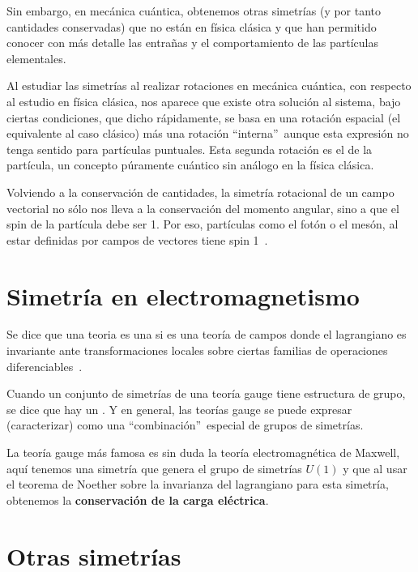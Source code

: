 Sin embargo, en mecánica cuántica, obtenemos otras simetrías (y por tanto cantidades conservadas) que no están en física clásica y que han permitido conocer con más detalle las entrañas y el comportamiento de las partículas elementales.

Al estudiar las simetrías al realizar rotaciones en mecánica cuántica, con respecto al estudio en física clásica, nos aparece que existe otra solución al sistema, bajo ciertas condiciones, que dicho rápidamente, se basa en una rotación espacial (el equivalente al caso clásico) más una rotación \textquotedblleft interna\textquotedblright\, aunque esta expresión no tenga sentido para partículas puntuales. Esta segunda rotación es el  de la partícula, un concepto púramente cuántico sin análogo en la física clásica.

Volviendo a la conservación de cantidades, la simetría rotacional de un campo vectorial no sólo nos lleva a la conservación del momento angular, sino a que el spin de la partícula debe ser 1.
Por eso, partículas como el fotón o el mesón, al estar definidas por campos de vectores tiene spin 1~\cite{QMS}.

\section{Simetría en electromagnetismo}\label{sec:simetria-en-electromagnetismo}

Se dice que una teoria es una  si es una teoría de campos donde el lagrangiano es invariante ante transformaciones locales sobre ciertas familias de operaciones diferenciables~\cite{MAQFT}.

Cuando un conjunto de simetrías de una teoría gauge tiene estructura de grupo, se dice que hay un .
Y en general, las teorías gauge se puede expresar (caracterizar) como una \textquotedblleft combinación\textquotedblright\ especial de grupos de simetrías.

La teoría gauge más famosa es sin duda la teoría electromagnética de Maxwell, aquí tenemos una simetría que genera el grupo de simetrías $U(1)$ y que al usar el teorema de Noether sobre la invarianza del lagrangiano para esta simetría, obtenemos la \textbf{conservación de la carga eléctrica}.

\section{Otras simetrías}\label{sec:otras-simetrias}

